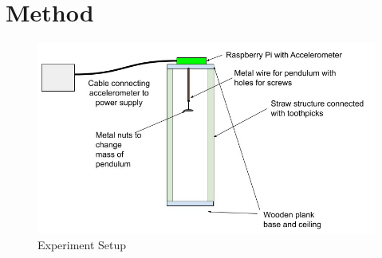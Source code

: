 \documentclass{article}
\begin{document}
\section{Method} 


\begin{figure}[h]
\centering
\includegraphics[width=330pt]{img/fig4.jpg}
\caption{\label{fig:4}Experiment Setup}
\end{figure}
\end{document}
